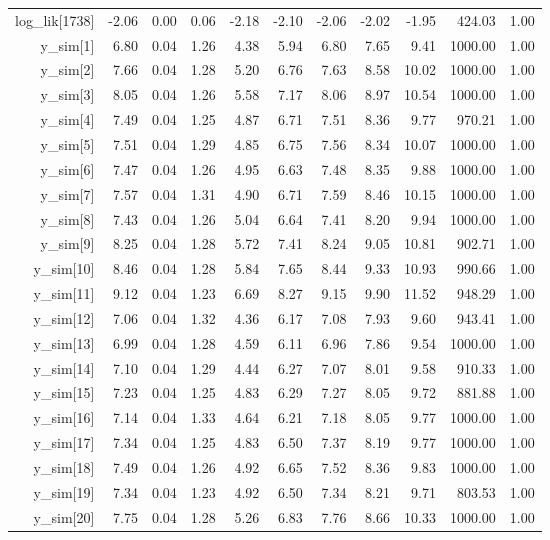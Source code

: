 \begin{table}[ht]
\begin{tabular}{rrrrrrrrrrr}
  log\_lik[1738] & -2.06 & 0.00 & 0.06 & -2.18 & -2.10 & -2.06 & -2.02 & -1.95 & 424.03 & 1.00 \\ 
  y\_sim[1] & 6.80 & 0.04 & 1.26 & 4.38 & 5.94 & 6.80 & 7.65 & 9.41 & 1000.00 & 1.00 \\ 
  y\_sim[2] & 7.66 & 0.04 & 1.28 & 5.20 & 6.76 & 7.63 & 8.58 & 10.02 & 1000.00 & 1.00 \\ 
  y\_sim[3] & 8.05 & 0.04 & 1.26 & 5.58 & 7.17 & 8.06 & 8.97 & 10.54 & 1000.00 & 1.00 \\ 
  y\_sim[4] & 7.49 & 0.04 & 1.25 & 4.87 & 6.71 & 7.51 & 8.36 & 9.77 & 970.21 & 1.00 \\ 
  y\_sim[5] & 7.51 & 0.04 & 1.29 & 4.85 & 6.75 & 7.56 & 8.34 & 10.07 & 1000.00 & 1.00 \\ 
  y\_sim[6] & 7.47 & 0.04 & 1.26 & 4.95 & 6.63 & 7.48 & 8.35 & 9.88 & 1000.00 & 1.00 \\ 
  y\_sim[7] & 7.57 & 0.04 & 1.31 & 4.90 & 6.71 & 7.59 & 8.46 & 10.15 & 1000.00 & 1.00 \\ 
  y\_sim[8] & 7.43 & 0.04 & 1.26 & 5.04 & 6.64 & 7.41 & 8.20 & 9.94 & 1000.00 & 1.00 \\ 
  y\_sim[9] & 8.25 & 0.04 & 1.28 & 5.72 & 7.41 & 8.24 & 9.05 & 10.81 & 902.71 & 1.00 \\ 
  y\_sim[10] & 8.46 & 0.04 & 1.28 & 5.84 & 7.65 & 8.44 & 9.33 & 10.93 & 990.66 & 1.00 \\ 
  y\_sim[11] & 9.12 & 0.04 & 1.23 & 6.69 & 8.27 & 9.15 & 9.90 & 11.52 & 948.29 & 1.00 \\ 
  y\_sim[12] & 7.06 & 0.04 & 1.32 & 4.36 & 6.17 & 7.08 & 7.93 & 9.60 & 943.41 & 1.00 \\ 
  y\_sim[13] & 6.99 & 0.04 & 1.28 & 4.59 & 6.11 & 6.96 & 7.86 & 9.54 & 1000.00 & 1.00 \\ 
  y\_sim[14] & 7.10 & 0.04 & 1.29 & 4.44 & 6.27 & 7.07 & 8.01 & 9.58 & 910.33 & 1.00 \\ 
  y\_sim[15] & 7.23 & 0.04 & 1.25 & 4.83 & 6.29 & 7.27 & 8.05 & 9.72 & 881.88 & 1.00 \\ 
  y\_sim[16] & 7.14 & 0.04 & 1.33 & 4.64 & 6.21 & 7.18 & 8.05 & 9.77 & 1000.00 & 1.00 \\ 
  y\_sim[17] & 7.34 & 0.04 & 1.25 & 4.83 & 6.50 & 7.37 & 8.19 & 9.77 & 1000.00 & 1.00 \\ 
  y\_sim[18] & 7.49 & 0.04 & 1.26 & 4.92 & 6.65 & 7.52 & 8.36 & 9.83 & 1000.00 & 1.00 \\ 
  y\_sim[19] & 7.34 & 0.04 & 1.23 & 4.92 & 6.50 & 7.34 & 8.21 & 9.71 & 803.53 & 1.00 \\ 
  y\_sim[20] & 7.75 & 0.04 & 1.28 & 5.26 & 6.83 & 7.76 & 8.66 & 10.33 & 1000.00 & 1.00 \\ 

\end{tabular}
\end{table}
